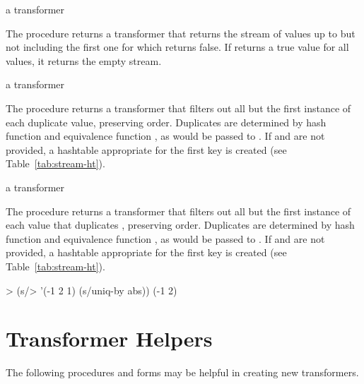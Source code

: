 \begin{procedure}
\end{procedure}
\returns{} a transformer

The  procedure returns a transformer that returns the stream of values
up to but not including the first one for which  returns false. If
 returns a true value for all values, it returns the empty stream.

\begin{procedure}
\end{procedure}
\returns{} a transformer

The  procedure returns a transformer that filters out all but the first
instance of each duplicate value, preserving order. Duplicates are determined by hash
function  and equivalence function , as would be passed to
. If  and  are not provided, a hashtable
appropriate for the first key is created (see Table~\ref{tab:stream-ht}).

\begin{procedure}
\end{procedure}
\returns{} a transformer

The  procedure returns a transformer that filters out all but the first
instance of each value  that duplicates ,
preserving order.  Duplicates are determined by hash function  and equivalence
function , as would be passed to . If  and
 are not provided, a hashtable appropriate for the first key is created (see
Table~\ref{tab:stream-ht}).

\codebegin
> (s/> '(-1 2 1) (s/uniq-by abs))
(-1 2)
\codeend

\section {Transformer Helpers}

The following procedures and forms may be helpful in creating new transformers.

\begin{variable}
\end{variable}
\antipar

